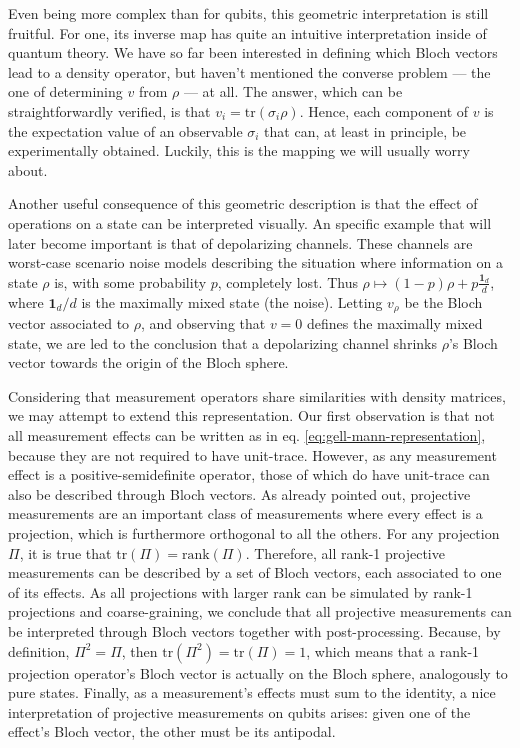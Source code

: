 		Even being more complex than for qubits, this geometric interpretation is still fruitful. For one, its inverse map has quite an intuitive interpretation inside of quantum theory. We have so far been interested in defining which Bloch vectors lead to a density operator, but haven't mentioned the converse problem --- the one of determining $v$ from $\rho$ --- at all. The answer, which can be straightforwardly verified, is that $v_i = \text{tr}(\sigma_i \rho)$. Hence, each component of $v$ is the expectation value of an observable $\sigma_i$ that can, at least in principle, be experimentally obtained. Luckily, this is the mapping we will usually worry about.

		Another useful consequence of this geometric description is that the effect of operations on a state can be interpreted visually. An specific example that will later become important is that of depolarizing channels. These channels are worst-case scenario noise models describing the situation where information on a state $\rho$ is, with some probability $p$, completely lost. Thus $\rho \mapsto (1 - p) \rho + p \frac{\mathbf{1}_d}{d}$, where $\mathbf{1}_d/d$ is the maximally mixed state (the noise). Letting $v_\rho$ be the Bloch vector associated to $\rho$, and observing that $v = 0$ defines the maximally mixed state, we are led to the conclusion that a depolarizing channel shrinks $\rho$'s Bloch vector towards the origin of the Bloch sphere.

		Considering that measurement operators share similarities with density matrices, we may attempt to extend this representation. Our first observation is that not all measurement effects can be written as in eq. \ref{eq:gell-mann-representation}, because they are not required to have unit-trace. However, as any measurement effect is a positive-semidefinite operator, those of which do have unit-trace can also be described through Bloch vectors. As already pointed out, projective measurements are an important class of measurements where every effect is a projection, which is furthermore orthogonal to all the others. For any projection $\Pi$, it is true that $\text{tr}(\Pi) = \text{rank}(\Pi)$. Therefore, all rank-1 projective measurements can be described by a set of Bloch vectors, each associated to one of its effects. As all projections with larger rank can be simulated by rank-1 projections and coarse-graining, we conclude that all projective measurements can be interpreted through Bloch vectors together with post-processing. Because, by definition, $\Pi^2 = \Pi$, then $\text{tr}(\Pi^2) = \text{tr}(\Pi) = 1$, which means that a rank-1 projection operator's Bloch vector is actually on the Bloch sphere, analogously to pure states. Finally, as a measurement's effects must sum to the identity, a nice interpretation of projective measurements on qubits arises: given one of the effect's Bloch vector, the other must be its antipodal.


